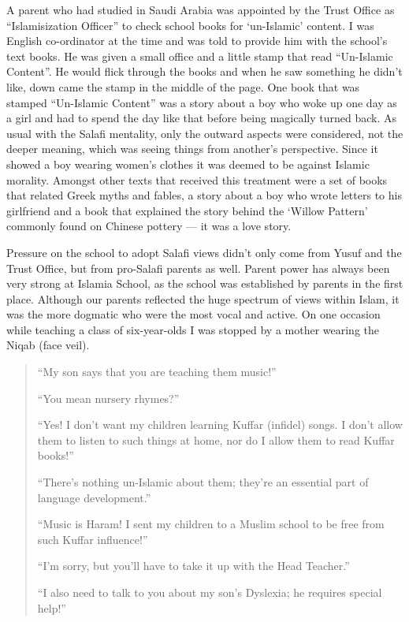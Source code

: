 \documentclass[12pt]{memoir}
\newcommand{\cor}[2]{#2} %
\begin{document}
A parent who had studied in Saudi Arabia was appointed
by the Trust Office as “Islamisization Officer”
to check school books for ‘un-Islamic’ content.
I was English co-ordinator at the time
and was told to provide him with the school’s text books.
He was given a small office and a little stamp
that \cor{that}{} read “Un-Islamic Content”.
He would flick \cor{though}{through} the books
and when he saw something he didn’t like,
down came the stamp in the middle of the page.
One book that was stamped “Un-Islamic Content” was a story about a boy
who woke up one day as a girl and had to spend the day like that
before being magically turned back.
As usual with the Salafi mentality,
only the outward aspects were considered, not the deeper meaning,
which was seeing things from another’s perspective.
Since it showed a boy wearing women’s clothes
it was deemed to be against Islamic morality.
Amongst other texts that received this treatment were a set of books
that related Greek myths and fables,
a story about a boy who wrote letters to his girlfriend
and a book that explained the story behind the ‘Willow Pattern’
commonly found on Chinese pottery — it was a love story.

Pressure on the school to adopt Salafi views didn’t only come from Yusuf
and the Trust \cor{office}{Office},
but from pro-Salafi parents\cor{}{ as well}.
Parent power has always been very strong at Islamia School,
as the school was established by parents in the first place.
Although our parents reflected the huge spectrum of views within Islam,
it was the more dogmatic who were the most vocal and active.
On one occasion while teaching a class of six-year-olds
I was stopped by a mother wearing the Niqab (face veil).

\begin{quote}
“My son says that you are teaching them music!”

“You mean nursery rhymes?”

“Yes! I don’t want my children learning Kuffar (infidel) songs.
I don’t allow them to listen to such things at home,
nor do I allow them to read Kuffar books!”

“There’s nothing un-Islamic about them;
they’re an essential part of language development.”

“Music is Haram! I sent my children to a Muslim school
to be free from such Kuffar influence!”

“I’m sorry, but you’ll have to take it up with the Head Teacher.”

“I also need to talk to you about \cor{is}{} my son’s Dyslexia;
he requires special help!”
\end{quote}
\end{document}

